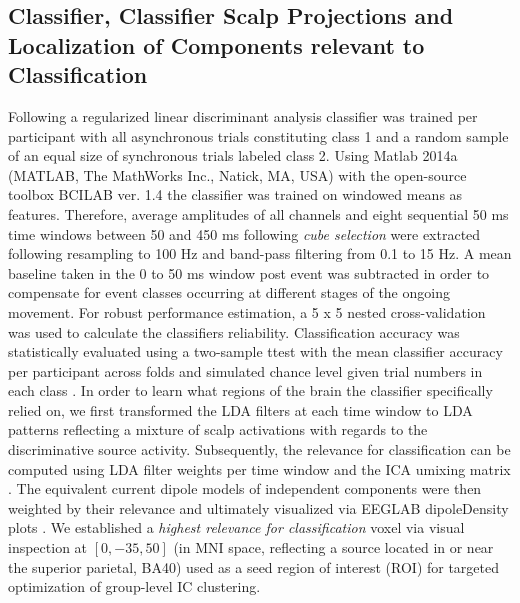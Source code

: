 \subsection{Classifier, Classifier Scalp Projections and Localization of Components relevant to Classification}
Following \citet{Zander2016} a regularized linear discriminant analysis classifier was trained per participant with all asynchronous trials constituting class 1 and a random sample of an equal size of synchronous trials labeled class 2. Using Matlab 2014a (MATLAB, The MathWorks Inc., Natick, MA, USA) with the open-source toolbox BCILAB ver. 1.4 the classifier was trained on windowed means as features. Therefore, average amplitudes of all channels and eight sequential 50 ms time windows between 50 and 450 ms following \textit{cube selection} were extracted following resampling to 100 Hz and band-pass filtering from 0.1 to 15 Hz. A mean baseline taken in the 0 to 50 ms window post event was subtracted in order to compensate for event classes occurring at different stages of the ongoing movement. For robust performance estimation, a 5 x 5 nested cross-validation was used to calculate the classifiers reliability. Classification accuracy was statistically evaluated using a two-sample ttest with the mean classifier accuracy per participant across folds and simulated chance level given trial numbers in each class \cite{Muller-Putz2007}. In order to learn what regions of the brain the classifier specifically relied on, we first transformed the LDA filters at each time window to LDA patterns reflecting a mixture of scalp activations with regards to the discriminative source activity. Subsequently, the relevance for classification can be computed using LDA filter weights per time window and the ICA umixing matrix \cites{Haufe2014a, Zander2016}. The equivalent current dipole models of independent components were then weighted by their relevance and ultimately visualized via EEGLAB dipoleDensity plots \cite{Krol2019}. We established a \textit{highest relevance for classification} voxel via visual inspection at $[0, -35, 50]$ (in MNI space, reflecting a source located in or near the superior parietal, BA40) used as a seed region of interest (ROI) for targeted optimization of group-level IC clustering.


